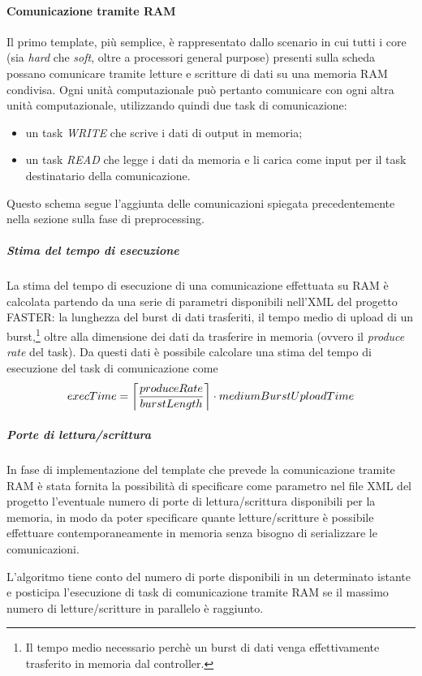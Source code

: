 \paragraph{Comunicazione tramite \acs{RAM}}
Il primo template, più semplice, è rappresentato dallo scenario in cui tutti i 
core (sia \emph{hard} che \emph{soft}, oltre a processori general purpose) presenti sulla 
scheda possano comunicare tramite letture e scritture di dati su una memoria 
\acs{RAM} condivisa. Ogni unità computazionale può pertanto comunicare con ogni 
altra unità computazionale, utilizzando quindi due task di comunicazione:
\begin{itemize}
 \item un task \emph{WRITE} che scrive i dati di output in memoria;
 \item un task \emph{READ} che legge i dati da memoria e li carica come input 
per il task destinatario della comunicazione.
\end{itemize}
Questo schema segue l'aggiunta delle comunicazioni spiegata precedentemente 
nella sezione sulla fase di preprocessing.

\subparagraph{Stima del tempo di esecuzione}
La stima del tempo di esecuzione di una comunicazione effettuata su \acs{RAM} è 
calcolata partendo da una serie di parametri disponibili nell'XML del progetto 
\ac{FASTER}: la lunghezza del burst di dati trasferiti, il tempo medio di upload 
di un burst,\footnote{Il tempo medio necessario perchè un burst di dati venga 
effettivamente trasferito in memoria dal controller.} oltre alla dimensione 
dei dati da trasferire in memoria (ovvero il \emph{produce rate} del task). Da 
questi dati è possibile calcolare una stima del tempo di esecuzione del task di 
comunicazione come
\begin{equation}
execTime = \ceil[\bigg]{\frac{produceRate}{burstLength}} \cdot 
mediumBurstUploadTime
\end{equation}

\subparagraph{Porte di lettura/scrittura}
In fase di implementazione del template che prevede la comunicazione tramite 
\acs{RAM} è stata fornita la possibilità di specificare come parametro nel file 
XML del progetto l'eventuale numero di porte di lettura/scrittura disponibili 
per la memoria, in modo da poter specificare quante letture/scritture è 
possibile effettuare contemporaneamente in memoria senza bisogno di 
serializzare le comunicazioni.

L'algoritmo tiene conto del numero di porte disponibili in un determinato istante
e posticipa l'esecuzione di task di comunicazione tramite \acs{RAM} se il
massimo numero di letture/scritture in parallelo è raggiunto.


